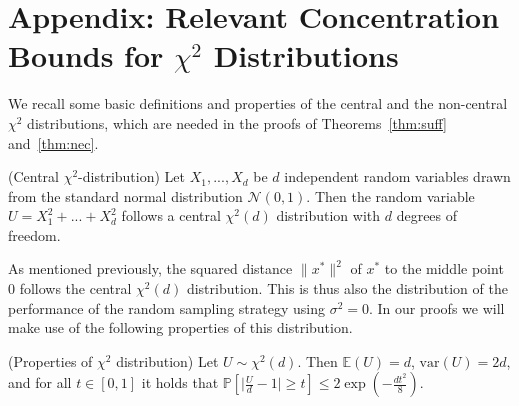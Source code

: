 
\section{Appendix: Relevant Concentration Bounds for $\chi^2$ Distributions}
\label{back}

We recall some basic definitions and properties of the central and the non-central $\chi^2$ distributions, which are needed in the proofs of Theorems~\ref{thm:suff} and~\ref{thm:nec}. %

\begin{definition}{(Central $\chi^2$-distribution)}
Let $X_1,...,X_d$ be $d$ independent random variables drawn from the standard normal distribution $\mathcal{N}(0,1)$. Then the random variable $U = X_1^2+...+X_d^2$ follows a central $\chi^2(d)$ distribution with $d$ degrees of freedom. 
\end{definition}
As mentioned previously, the squared distance $\lVert x^*\rVert^2$ of $x^*$ to the middle point $0$ follows the central $\chi^2(d)$ distribution. This is thus also the distribution of the performance of the random sampling strategy using $\sigma^2=0$. In our proofs we will make use of the following properties of this distribution. 
\begin{property}{(Properties of $\chi^2$ distribution)}
\label{ppty:chi2}
Let $U\sim \chi^2(d)$. Then $\mathbb{E}(U)=d$, $\text{var}(U) = 2d$, and for all $t\in[0,1]$ it holds that $\mathbb{P}\left[\lvert\frac{U}{d}-1\rvert\geq t\right]\leq 2\exp({-\frac{dt^2}{8}})$.
\end{property}

